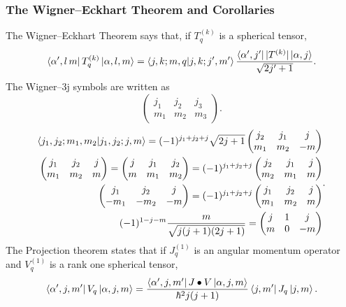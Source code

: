 \documentclass{article}
\begin{document}
    \subsubsection*{The Wigner--Eckhart Theorem and Corollaries}
			The Wigner--Eckhart Theorem says that, if $T_q^{(k)}$ is a spherical tensor,
      \[
				\bra{\alpha',l\,m}T_q^{(k)}\ket{\alpha ,l,m} =
				\bra{j,k;m,q}\ket{j,k;j',m'}
				\frac{\bra{\alpha',j'}|T^{(k)}|\ket{\alpha,j}}{\sqrt{2 j' + 1}}
      .\] 
      The Wigner--3j symbols are written as 
      \[
      \begin{pmatrix}
        j_1 & j_2 & j_3 \\
        m_1 & m_2 & m_3
      \end{pmatrix}
      .\] 
      \[
        \begin{split}
          \bra{j_1,j_2;m_1,m_2}\ket{j_1,j_2;j,m} = (-1)^{j_1+j_2+j} \sqrt{2j+1}
          \begin{pmatrix}
            j_2 & j_1 & j \\
            m_1 & m_2 & -m
          \end{pmatrix} \\
          \begin{pmatrix}
            j_1 & j_2 & j \\
            m_1 & m_2 & m 
          \end{pmatrix} = 
          \begin{pmatrix}
            j & j_1 & j_2 \\
            m & m_1 & m_2 
          \end{pmatrix} = (-1)^{j_1 + j_2 + j} 
          \begin{pmatrix}
            j_2 & j_1 &j \\
            m_2 & m_1 & m
          \end{pmatrix} \\
          \begin{pmatrix}
            j_1 & j_2 & j \\
            -m_1 & -m_2 & -m 
          \end{pmatrix} = (-1)^{j_1 + j_2 + j}
          \begin{pmatrix}
            j_1 & j_2 & j \\
            m_1 & m_2 & m
          \end{pmatrix} \\
          (-1)^{1 - j - m}\frac{m}{\sqrt{j(j+1)(2j+1)}} = 
          \begin{pmatrix}
            j & 1 & j \\
            m & 0 & -m
          \end{pmatrix}
        \end{split}
      .\] 
		The Projection theorem states that if $J_q^{(1)}$ is an angular momentum 
      operator and $V_q^{(1)}$ is a rank one spherical tensor, 
      \[
        \bra{\alpha',j,m'}V_q\ket{\alpha,j,m} = 
        \frac{\bra{\alpha',j,m'}J\bullet V\ket{\alpha,j,m}}{\hbar^2 j(j+1)}
        \bra{j,m'}J_q\ket{j,m}
      .\] 
      

\end{document}
